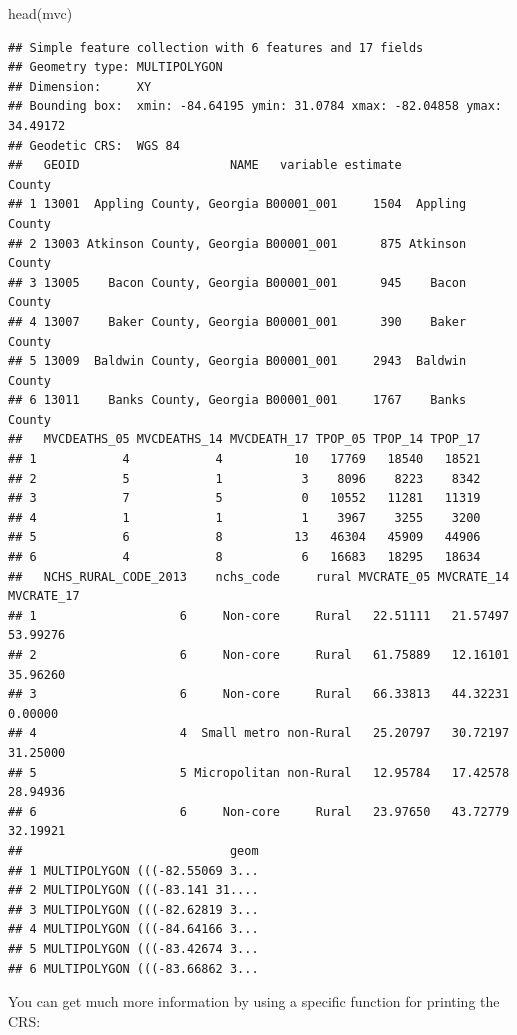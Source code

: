 \documentclass[
]{book}
\newenvironment{Shaded}{\begin{snugshade}}{\end{snugshade}}
\newcommand{\FunctionTok}[1]{\textcolor[rgb]{0.00,0.00,0.00}{#1}}
\newcommand{\NormalTok}[1]{#1}
\begin{document}
\begin{Shaded}
\begin{Highlighting}[]
\FunctionTok{head}\NormalTok{(mvc)}
\end{Highlighting}
\end{Shaded}

\begin{verbatim}
## Simple feature collection with 6 features and 17 fields
## Geometry type: MULTIPOLYGON
## Dimension:     XY
## Bounding box:  xmin: -84.64195 ymin: 31.0784 xmax: -82.04858 ymax: 34.49172
## Geodetic CRS:  WGS 84
##   GEOID                     NAME   variable estimate          County
## 1 13001  Appling County, Georgia B00001_001     1504  Appling County
## 2 13003 Atkinson County, Georgia B00001_001      875 Atkinson County
## 3 13005    Bacon County, Georgia B00001_001      945    Bacon County
## 4 13007    Baker County, Georgia B00001_001      390    Baker County
## 5 13009  Baldwin County, Georgia B00001_001     2943  Baldwin County
## 6 13011    Banks County, Georgia B00001_001     1767    Banks County
##   MVCDEATHS_05 MVCDEATHS_14 MVCDEATH_17 TPOP_05 TPOP_14 TPOP_17
## 1            4            4          10   17769   18540   18521
## 2            5            1           3    8096    8223    8342
## 3            7            5           0   10552   11281   11319
## 4            1            1           1    3967    3255    3200
## 5            6            8          13   46304   45909   44906
## 6            4            8           6   16683   18295   18634
##   NCHS_RURAL_CODE_2013    nchs_code     rural MVCRATE_05 MVCRATE_14 MVCRATE_17
## 1                    6     Non-core     Rural   22.51111   21.57497   53.99276
## 2                    6     Non-core     Rural   61.75889   12.16101   35.96260
## 3                    6     Non-core     Rural   66.33813   44.32231    0.00000
## 4                    4  Small metro non-Rural   25.20797   30.72197   31.25000
## 5                    5 Micropolitan non-Rural   12.95784   17.42578   28.94936
## 6                    6     Non-core     Rural   23.97650   43.72779   32.19921
##                             geom
## 1 MULTIPOLYGON (((-82.55069 3...
## 2 MULTIPOLYGON (((-83.141 31....
## 3 MULTIPOLYGON (((-82.62819 3...
## 4 MULTIPOLYGON (((-84.64166 3...
## 5 MULTIPOLYGON (((-83.42674 3...
## 6 MULTIPOLYGON (((-83.66862 3...
\end{verbatim}

You can get much more information by using a specific function for printing the CRS:
\end{document}
